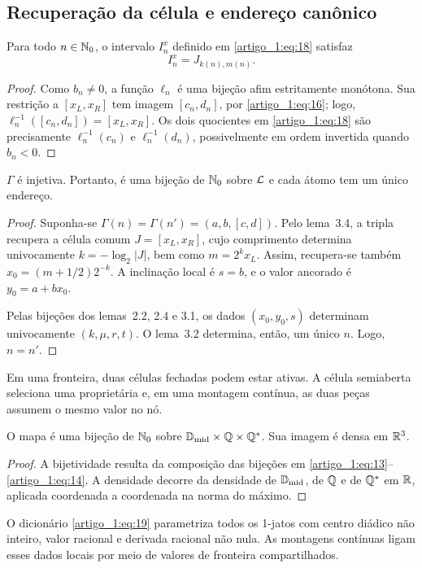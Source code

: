 \subsection{Recuperação da célula e endereço canônico}
\begin{lema}\label{map:artigo_1:3.4}
Para todo $n\in\mathbb N_0$, o intervalo $I_n^x$ definido em \eqref{artigo_1:eq:18} satisfaz
\[
I_n^x=J_{k(n),m(n)}.
\]
\end{lema}
\begin{proof}
Como $b_n\ne0$, a função $\ell_n$ é uma bijeção afim estritamente monótona. Sua restrição a $[x_L,x_R]$ tem imagem $[c_n,d_n]$, por \eqref{artigo_1:eq:16}; logo, $\ell_n^{-1}([c_n,d_n])=[x_L,x_R]$. Os dois quocientes em \eqref{artigo_1:eq:18} são precisamente $\ell_n^{-1}(c_n)$ e $\ell_n^{-1}(d_n)$, possivelmente em ordem invertida quando $b_n<0$.
\end{proof}
\begin{teorema}\label{map:artigo_1:3.5}
$\Gamma$ é injetiva. Portanto, é uma bijeção de $\mathbb N_0$ sobre $\mathcal L$ e cada átomo tem um único endereço.
\end{teorema}
\begin{proof}
Suponha-se $\Gamma(n)=\Gamma(n')=(a,b,[c,d])$. Pelo lema~3.4, a tripla recupera a célula comum $J=[x_L,x_R]$, cujo comprimento determina univocamente $k=-\log_2|J|$, bem como $m=2^kx_L$. Assim, recupera-se também $x_0=(m+1/2)2^{-k}$. A inclinação local é $s=b$, e o valor ancorado é $y_0=a+bx_0$.

Pelas bijeções dos lemas~2.2, 2.4 e 3.1, os dados $(x_0,y_0,s)$ determinam univocamente $(k,\mu,r,t)$. O lema~3.2 determina, então, um único $n$. Logo, $n=n'$.
\end{proof}
Em uma fronteira, duas células fechadas podem estar ativas. A célula semiaberta seleciona uma proprietária e, em uma montagem contínua, as duas peças assumem o mesmo valor no nó.
\begin{teorema}\label{map:artigo_1:3.6}
O mapa
é uma bijeção de $\mathbb N_0$ sobre $\mathbb D_{\rm mid}\times\mathbb Q\times\mathbb Q^*$. Sua imagem é densa em $\mathbb R^3$.
\end{teorema}
\begin{proof}
A bijetividade resulta da composição das bijeções em \eqref{artigo_1:eq:13}--\eqref{artigo_1:eq:14}. A densidade decorre da densidade de $\mathbb D_{\rm mid}$, de $\mathbb Q$ e de $\mathbb Q^*$ em $\mathbb R$, aplicada coordenada a coordenada na norma do máximo.
\end{proof}
O dicionário \eqref{artigo_1:eq:19} parametriza todos os 1-jatos com centro diádico não inteiro, valor racional e derivada racional não nula. As montagens contínuas ligam esses dados locais por meio de valores de fronteira compartilhados.

